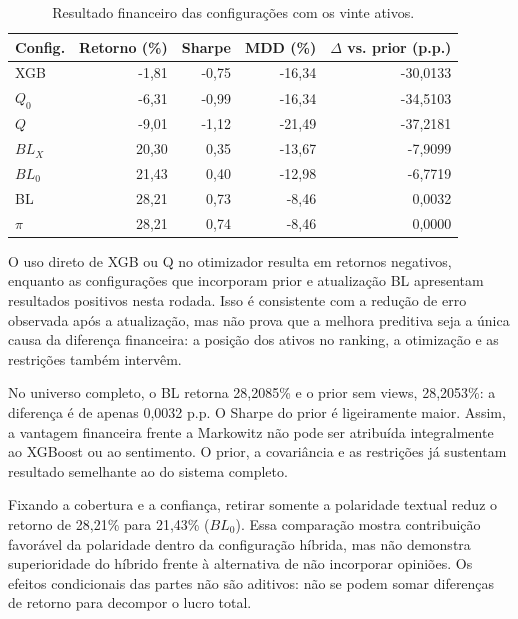 \begin{table}[H]\centering
\caption{Resultado financeiro das configurações com os vinte ativos.}
\label{tab:financeiro_camadas_20}
{\footnotesize\setlength{\tabcolsep}{4pt}\begin{tabular}{lrrrr}\hline
Config. & Retorno (\%) & Sharpe & MDD (\%) & $\Delta$ vs. prior (p.p.)\\ \hline
XGB & -1,81 & -0,75 & -16,34 & -30,0133\\
$Q_0$ & -6,31 & -0,99 & -16,34 & -34,5103\\
$Q$ & -9,01 & -1,12 & -21,49 & -37,2181\\
$BL_X$ & 20,30 & 0,35 & -13,67 & -7,9099\\
$BL_0$ & 21,43 & 0,40 & -12,98 & -6,7719\\
BL & 28,21 & 0,73 & -8,46 & 0,0032\\
$\pi$ & 28,21 & 0,74 & -8,46 & 0,0000\\
\hline\end{tabular}}
\par{}
\end{table}

O uso direto de XGB ou Q no otimizador resulta em retornos negativos, enquanto as configurações que incorporam prior e atualização BL apresentam resultados positivos nesta rodada. Isso é consistente com a redução de erro observada após a atualização, mas não prova que a melhora preditiva seja a única causa da diferença financeira: a posição dos ativos no ranking, a otimização e as restrições também intervêm.

No universo completo, o BL retorna 28,2085\% e o prior sem views, 28,2053\%: a diferença é de apenas 0,0032 p.p. O Sharpe do prior é ligeiramente maior. Assim, a vantagem financeira frente a Markowitz não pode ser atribuída integralmente ao XGBoost ou ao sentimento. O prior, a covariância e as restrições já sustentam resultado semelhante ao do sistema completo.

Fixando a cobertura e a confiança, retirar somente a polaridade textual reduz o retorno de 28,21\% para 21,43\% ($BL_0$). Essa comparação mostra contribuição favorável da polaridade dentro da configuração híbrida, mas não demonstra superioridade do híbrido frente à alternativa de não incorporar opiniões. Os efeitos condicionais das partes não são aditivos: não se podem somar diferenças de retorno para decompor o lucro total.

